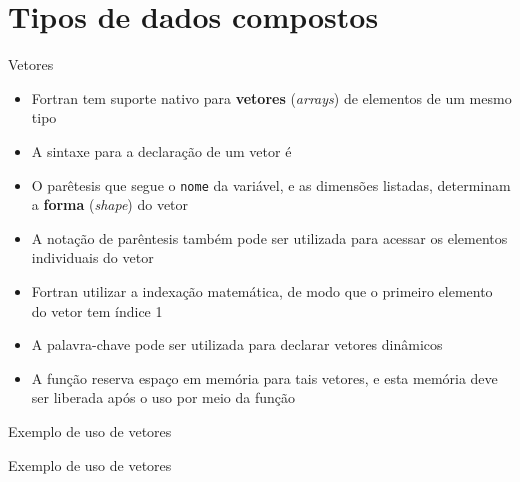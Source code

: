 \section{Tipos de dados compostos}

\begin{frame}[fragile]{Vetores}

    \begin{itemize}
        \item Fortran tem suporte nativo para \textbf{vetores} (\textit{arrays}) de elementos de 
            um mesmo tipo

        \item A sintaxe para a declaração de um vetor é 


        \item O parêtesis que segue o \texttt{nome} da variável, e as dimensões listadas,
            determinam a \textbf{forma} (\textit{shape}) do vetor

        \item A notação de parêntesis também pode ser utilizada para acessar os elementos
            individuais do vetor

        \item Fortran utilizar a indexação matemática, de modo que o primeiro elemento do vetor
            tem índice 1

        \item A palavra-chave  pode ser utilizada para declarar
            vetores dinâmicos

        \item A função  reserva espaço em memória para tais vetores, e
            esta memória deve ser liberada após o uso por meio da função 

    \end{itemize}

\end{frame}

\begin{frame}[fragile]{Exemplo de uso de vetores}
\end{frame}

\begin{frame}[fragile]{Exemplo de uso de vetores}
\end{frame}

